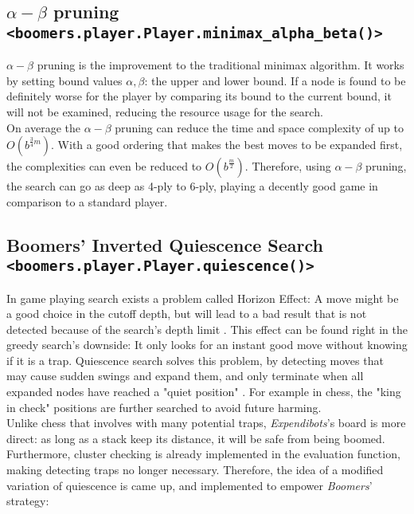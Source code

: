 \documentclass[]{article}
\newcommand{\gameName}{Expendibots}
\begin{document}
\subsection{$\alpha-\beta$ pruning \texttt{<boomers.player.Player.minimax\_alpha\_beta()>}}

$\alpha-\beta$ pruning is the improvement to the traditional minimax algorithm. It works by setting bound values $\alpha,\beta$: the upper and lower bound. If a node is found to be definitely worse for the player by comparing its bound to the current bound, it will not be examined, reducing the resource usage for the search. \\

On average the $\alpha-\beta$ pruning can reduce the time and space complexity of up to $O(b^{\frac{3}{4}m})$. With a good ordering that makes the best moves to be expanded first, the complexities can even be reduced to $O(b^{\frac{m}{2}})$. Therefore, using $\alpha-\beta$ pruning, the search can go as deep as 4-ply to 6-ply, playing a decently good game in comparison to a standard player.

\subsection{Boomers' Inverted Quiescence Search \texttt{<boomers.player.Player.quiescence()>}}

In game playing search exists a problem called Horizon Effect: A move might be a good choice in the cutoff depth, but will lead to a bad result that is not detected because of the search's depth limit \cite{horizon}. This effect can be found right in the greedy search's downside: It only looks for an instant good move without knowing if it is a trap. Quiescence search solves this problem, by detecting moves that may cause sudden swings and expand them, and only terminate when all expanded nodes have reached a "quiet position" \cite{aima}. For example in chess, the "king in check" positions are further searched to avoid future harming.\\

Unlike chess that involves with many potential traps, \emph{\gameName}'s board is more direct: as long as a stack keep its distance, it will be safe from being boomed. Furthermore, cluster checking is already implemented in the evaluation function, making detecting traps no longer necessary. Therefore, the idea of a modified variation of quiescence is came up, and implemented to empower \emph{Boomers}' strategy:
\end{document}
